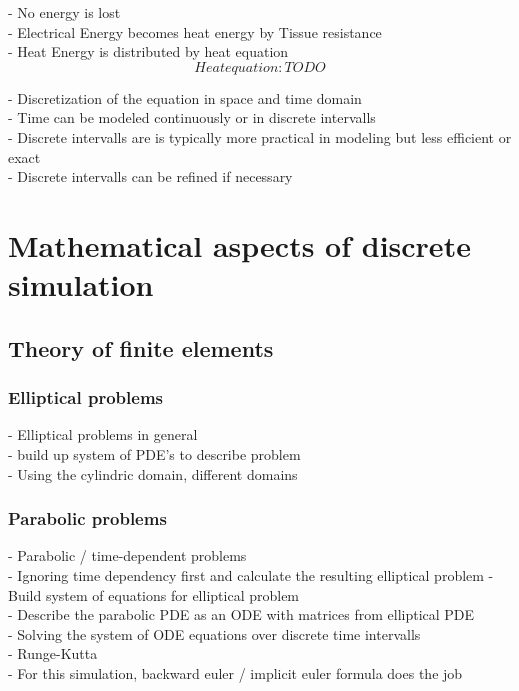 \documentclass[parskip=half, titlepage=yes, 12pt, BCOR=12mm, DIV=calc]{scrartcl}
\begin{document}
- No energy is lost \\
- Electrical Energy becomes heat energy by Tissue resistance \\
- Heat Energy is distributed by heat equation \\

\begin{equation}
    Heat equation : TODO 
\end{equation}

- Discretization of the equation in space and time domain \\
- Time can be modeled continuously or in discrete intervalls \\
- Discrete intervalls are is typically more practical in modeling but less efficient or exact \\
- Discrete intervalls can be refined if necessary \\

\section{Mathematical aspects of discrete simulation}

\subsection{Theory of finite elements}

\subsubsection{Elliptical problems}
- Elliptical problems in general \\
- build up system of PDE's to describe problem \\
- Using the cylindric domain, different domains \\

\subsubsection{Parabolic problems}
- Parabolic / time-dependent problems \\
- Ignoring time dependency first and calculate the resulting elliptical problem
- Build system of equations for elliptical problem \\
- Describe the parabolic PDE as an ODE with matrices from elliptical PDE \\
- Solving the system of ODE equations over discrete time intervalls \\
- Runge-Kutta \\
- For this simulation, backward euler / implicit euler formula does the job \\
\end{document}
